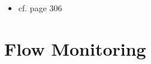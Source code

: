 	\begin{itemize}
		\item cf. \textcite{Whitman2009} page 306 
	\end{itemize}

\section{Flow Monitoring}
\label{sec:background:network:netflow}

